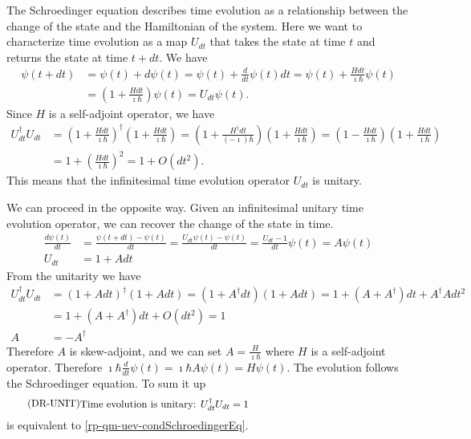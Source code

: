 The Schroedinger equation describes time evolution as a relationship between the change of the state and the Hamiltonian of the system. Here we want to characterize time evolution as a map $U_{dt}$ that takes the state at time $t$ and returns the state at time $t + dt$. We have
\begin{equation}
	\begin{aligned}
		\psi(t+dt) &= \psi(t) + d\psi(t) = \psi(t) + \frac{d}{dt} \psi(t) dt = \psi(t)+ \frac{H dt}{\imath \hbar} \psi(t)\\
		&= \left(1 + \frac{H dt}{\imath \hbar}\right)\psi(t) = U_{dt}\psi(t).
	\end{aligned}
\end{equation}
Since $H$ is a self-adjoint operator, we have
\begin{equation}
	\begin{aligned}
		U_{dt}^\dagger U_{dt} &= \left(1 + \frac{H dt}{\imath \hbar}\right)^\dagger \left(1 + \frac{H dt}{\imath \hbar}\right) = \left(1 + \frac{H^\dagger dt}{(- \imath) \hbar}\right) \left(1 + \frac{H dt}{\imath \hbar}\right) = \left(1 - \frac{H dt}{\imath \hbar}\right) \left(1 + \frac{H dt}{\imath \hbar}\right) \\
		&= 1 + \left(\frac{H dt}{\imath \hbar}\right)^2 = 1 + O(dt^2).
	\end{aligned}
\end{equation}
This means that the infinitesimal time evolution operator $U_{dt}$ is unitary.

We can proceed in the opposite way. Given an infinitesimal unitary time evolution operator, we can recover the change of the state in time.
\begin{equation}
	\begin{aligned}
		\frac{d\psi(t)}{dt} &= \frac{\psi(t+dt) - \psi(t)}{dt} = \frac{U_{dt}\psi(t) - \psi(t)}{dt} = \frac{U_{dt} - 1}{dt} \psi(t) = A \psi(t)\\
		U_{dt} &= 1 + A dt
	\end{aligned}
\end{equation}
From the unitarity we have
\begin{equation}
	\begin{aligned}
		U_{dt}^\dagger U_{dt} &= \left(1 + A dt\right)^\dagger \left(1 + A dt\right) = \left(1 + A^\dagger dt\right) \left(1 + A dt\right) = 1 + \left(A + A^\dagger\right)dt + A^\dagger A dt^2 \\
		&= 1 + \left(A + A^\dagger\right)dt + O(dt^2) = 1 \\
		A &= - A^\dagger
	\end{aligned}
\end{equation}
Therefore $A$ is skew-adjoint, and we can set $A = \frac{H}{\imath \hbar}$ where $H$ is a self-adjoint operator. Therefore $\imath \hbar \frac{d}{dt} \psi(t) = \imath \hbar A \psi(t) = H \psi(t)$. The evolution follows the Schroedinger equation. To sum it up
\begin{equation}\label{rp-qm-uev-condUnitaryEvolution}
	\tag{DR-UNIT}
	\eqtext{Time evolution is unitary: $U^{\dagger}_{dt} U_{dt} = 1$} 
\end{equation}
is equivalent to \ref{rp-qm-uev-condSchroedingerEq}.

